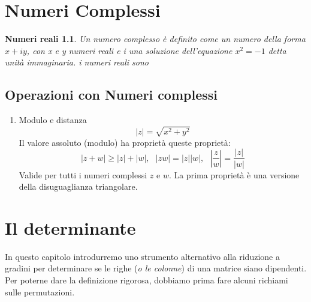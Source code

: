 \documentclass{book}
\newcommand{\abs}[1]{\lvert#1\rvert}
\begin{document}
\chapter {Numeri Complessi}
\newtheorem{NumComp}{Numeri reali}
\begin{NumComp}
	Un numero complesso è definito come un numero della forma $x+iy$, con x e y numeri reali e i una
	soluzione dell'equazione $x^2=-1$ detta unità immaginaria. i numeri reali
	sono
\end{NumComp}
\section{Operazioni con Numeri complessi}
\begin{enumerate}
\item Modulo e distanza
	\begin{equation}
		\abs{z}=\sqrt{x^2+y^2}
	\end{equation}
	Il valore assoluto (modulo) ha proprietà queste proprietà:
	\begin{equation*}
		\abs{z+w}\geq \abs{z}+\abs{w}, \text{ } \abs{zw}=\abs{z}\abs{w}, \text{ } \left|\frac{z}{w}\right|=\frac{\abs z}{\abs w}
	\end{equation*}
	Valide per tutti i numeri complessi $z$ e $w$. La prima proprietà è una versione della disuguaglianza triangolare.

\end{enumerate}
\chapter{Il determinante \label{ildet}}
In questo capitolo introdurremo uno strumento alternativo alla riduzione a gradini per determinare se le righe ({\it o le colonne}) di una matrice
siano dipendenti. Per poterne dare la definizione rigorosa, dobbiamo prima fare alcuni richiami sulle permutazioni.
\end{document}
